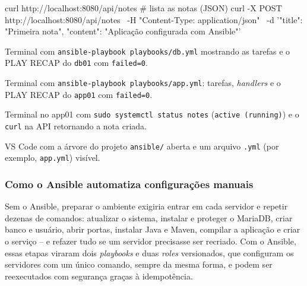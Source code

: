 \begin{terminal}[caption={Teste da API da aplicação no app01},label={cod:testes-api}]
curl http://localhost:8080/api/notes          # lista as notas (JSON)
curl -X POST http://localhost:8080/api/notes \
  -H "Content-Type: application/json" \
  -d '{"title": "Primeira nota", "content": "Aplicação configurada com Ansible"}'
\end{terminal}

%
  {Terminal com \texttt{ansible-playbook playbooks/db.yml} mostrando as tarefas e o PLAY RECAP do
   \texttt{db01} com \texttt{failed=0}.}

%
  {Terminal com \texttt{ansible-playbook playbooks/app.yml}: tarefas, \textit{handlers} e o
   PLAY RECAP do \texttt{app01} com \texttt{failed=0}.}

%
  {Terminal no app01 com \texttt{sudo systemctl status notes} (\texttt{active (running)}) e o
   \texttt{curl} na API retornando a nota criada.}

%
  {VS Code com a árvore do projeto \texttt{ansible/} aberta e um arquivo \texttt{.yml}
   (por exemplo, \texttt{app.yml}) visível.}

\subsubsection{Como o Ansible automatiza configurações manuais}

Sem o Ansible, preparar o ambiente exigiria entrar em cada servidor e repetir dezenas de comandos:
atualizar o sistema, instalar e proteger o MariaDB, criar banco e usuário, abrir portas, instalar Java e
Maven, compilar a aplicação e criar o serviço -- e refazer tudo se um servidor precisasse ser recriado.
Com o Ansible, essas etapas viraram dois \textit{playbooks} e duas \textit{roles} versionados, que
configuram os servidores com um único comando, sempre da mesma forma, e podem ser reexecutados com
segurança graças à idempotência.

